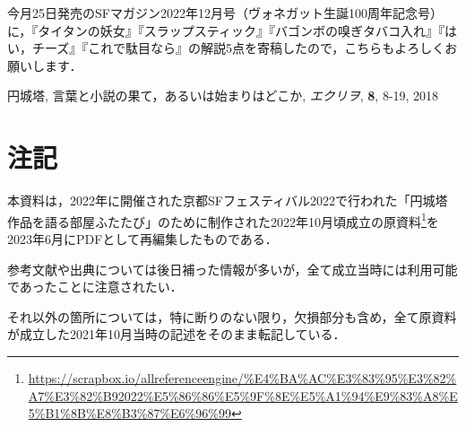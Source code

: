 \documentclass[10pt, a5paper, twoside]{jsarticle}
\theoremstyle{definition}
\begin{document}
		今月25日発売のSFマガジン2022年12月号（ヴォネガット生誕100周年記念号）に，『タイタンの妖女』『スラップスティック』『バゴンボの嗅ぎタバコ入れ』『はい，チーズ』『これで駄目なら』の解説5点を寄稿したので，こちらもよろしくお願いします．

	\begin{thebibliography}{99}

		 円城塔, 言葉と小説の果て，あるいは始まりはどこか, \textit{エクリヲ}, \textbf{8}, 8-19, 2018

	\end{thebibliography}

	\clearpage

	\section*{注記}

		本資料は，2022年に開催された京都SFフェスティバル2022で行われた「円城塔作品を語る部屋ふたたび」のために制作された2022年10月頃成立の原資料\footnote{\url{https://scrapbox.io/allreferenceengine/%E4%BA%AC%E3%83%95%E3%82%A7%E3%82%B92022%E5%86%86%E5%9F%8E%E5%A1%94%E9%83%A8%E5%B1%8B%E8%B3%87%E6%96%99}}を2023年6月にPDFとして再編集したものである．

		参考文献や出典については後日補った情報が多いが，全て成立当時には利用可能であったことに注意されたい．

		それ以外の箇所については，特に断りのない限り，欠損部分も含め，全て原資料が成立した2021年10月当時の記述をそのまま転記している．
\end{document}
